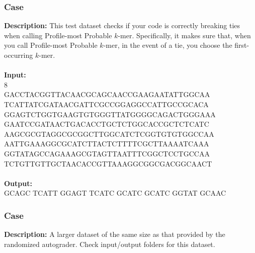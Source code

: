 \documentclass{article}
\newcommand{\code}[1]{{\fontfamily{pcr}\selectfont #1}}
\begin{document}
\subsubsection*{Case }
\hline \vspace{5}
\textbf{Description:} This test dataset checks if your code is correctly breaking ties when calling Profile-most Probable $k$-mer. Specifically, it makes sure that, when you call Profile-most Probable $k$-mer, in the event of a tie, you choose the first-occurring $k$-mer.\\ \\
\noindent \textbf{Input:}\\
\code{5 8\\GACCTACGGTTACAACGCAGCAACCGAAGAATATTGGCAA\\TCATTATCGATAACGATTCGCCGGAGGCCATTGCCGCACA\\GGAGTCTGGTGAAGTGTGGGTTATGGGGCAGACTGGGAAA\\GAATCCGATAACTGACACCTGCTCTGGCACCGCTCTCATC\\AAGCGCGTAGGCGCGGCTTGGCATCTCGGTGTGTGGCCAA\\AATTGAAAGGCGCATCTTACTCTTTTCGCTTAAAATCAAA\\GGTATAGCCAGAAAGCGTAGTTAATTTCGGCTCCTGCCAA\\TCTGTTGTTGCTAACACCGTTAAAGGCGGCGACGGCAACT}\\ \\
\noindent \textbf{Output:}\\
\code{GCAGC TCATT GGAGT TCATC GCATC GCATC GGTAT GCAAC}

\subsubsection*{Case }
\hline \vspace{5}
\textbf{Description:} A larger dataset of the same size as that provided by the randomized autograder. Check input/output folders for this dataset.\\ \\
\pagebreak
\end{document}

